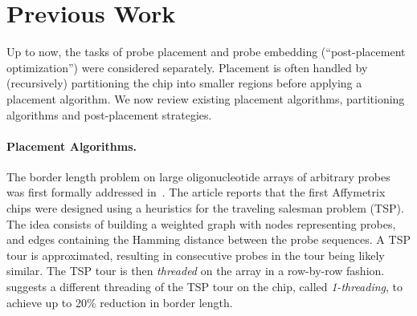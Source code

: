 \documentclass{llncs}
\newcommand{\ignore}[1]{}
\begin{document}
\section{Previous Work}
\label{sec:previous_work}

Up to now, the tasks of probe placement and probe embedding (``post-placement
optimization'') were considered separately. Placement is often handled by
(recursively) partitioning the chip into smaller regions before applying a
placement algorithm. We now review existing placement algorithms, partitioning
algorithms and post-placement strategies.

\paragraph{Placement Algorithms.}
The border length problem on large oligonucleotide arrays of arbitrary probes
was first formally addressed in~\cite{HANNENHALLI02}. The article reports that
the first Affymetrix chips were designed using a heuristics for the traveling
salesman problem (TSP). The idea consists of building a weighted graph with
nodes representing probes, and edges containing the Hamming distance between
the probe sequences. A TSP tour is approximated, resulting in consecutive
probes in the tour being likely similar. The TSP tour is then
\emph{threaded} on the array in a row-by-row fashion.  \cite{HANNENHALLI02}
suggests a different threading of the TSP tour on the chip, called
\emph{1-threading}, to achieve up to 20\% reduction in border length.

\ignore{ Kahng~{\it et~al}.~\cite{KAHNG02} propose the \emph{Epitaxial}
  placement algorithm that places a random probe in the center of the array
  and continues to insert probes in spots adjacent to already filled spots,
  employing a greedy heuristic to select the next spot to be filled and the
  probe that is assigned to it. Priority is given to spots whose neighbors are
  already filled, in which case the algorithm places the probe with minimum
  sum of Hamming distances to its neighbors. If no such a spot exists, the
  algorithm examines all non-filled spots~$s_i$ with $n_i \geq 1$ filled
  neighbors and finds a non-assigned probe $p_j$ with minimum sum of Hamming
  distances to the neighboring probes $H_{ij}$. For each possible assignment
  of $p_j$ to $s_i$, it computes a cost $c(s_i,p_j) := k_{n_i} H_{ij} / n$,
  where $k_{n_i}$ are scaling coefficients ($k_1 = 1$, $k_2 = 0.8$, and $k_3 =
  0.6$), and makes the assignment with minimum cost. With this algorithm, they
  claimed to achieve up to 10\% reduction in border conflicts over the
  TSP-based approach of Hannenhalli~{\it et~al}.\ \cite{HANNENHALLI02}.
%  
}
\end{document}
